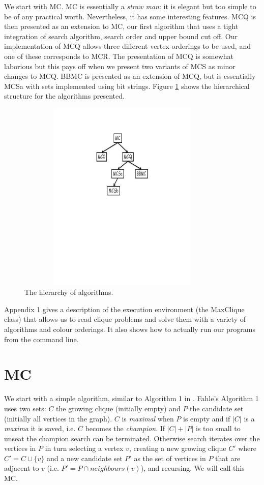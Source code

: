 \documentclass{l4proj}
\begin{document}
We start with MC. MC is essentially a \emph{straw man}: it is elegant but too simple to be of any practical worth.
Nevertheless, it has some interesting features. MCQ is then presented as an extension to MC, our first algorithm that uses a tight integration of 
search algorithm, search order and upper bound cut off. Our implementation of MCQ allows three different vertex orderings 
to be used, and one of these corresponds to MCR. The presentation of MCQ is somewhat laborious but this pays off when we present
two variants of MCS as minor changes to MCQ. BBMC is presented as an extension of MCQ, but is essentially MCSa with sets implemented using
bit strings. Figure \ref{inheritance} shows the hierarchical structure for the algorithms presented.
\vspace{-5mm}
\begin{figure}
\centering
\includegraphics[height=9.2cm,width=10.2cm]{inheritance.pdf}
\vspace{-50mm}
\caption{The hierarchy of algorithms.}
\label{inheritance}
\end{figure}

\noindent
Appendix 1 gives a description of the execution environment (the MaxClique class) that allows us to 
read clique problems and solve them with a variety of algorithms and colour orderings. It also shows how to actually run our programs
from the command line.

%
\section{MC}
\label{sec:mcCode}
We start with  a simple algorithm, similar to Algorithm 1 in \cite{fahle}. Fahle's Algorithm 1 uses two sets: $C$ the growing clique
(initially empty) and $P$ the candidate set (initially all vertices in the graph). $C$ is \emph{maximal} when $P$ is empty and if
$|C|$ is a \emph{maxima} it is saved, i.e. $C$ becomes the \emph{champion}. If $|C| + |P|$ is too small to unseat the champion
search can be terminated. Otherwise search iterates over the vertices in $P$ in turn selecting a vertex $v$,
creating a new growing clique $C'$ where $C' = C \cup \{v\}$ and a new candidate
set $P'$ as the set of vertices in $P$ that are adjacent to $v$ (i.e. $P' = P \cap neighbours(v)$), 
and recursing. We will call this MC.
\end{document}
